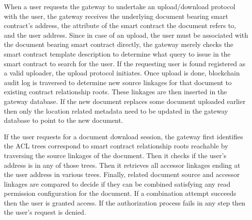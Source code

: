 When a user requests the gateway to undertake an upload/download protocol with the user, the gateway receives the underlying document bearing smart contract's address, the attribute of the smart contract the document refers to, and the user address. Since in case of an upload, the user must be associated with the document bearing smart contract directly, the gateway merely checks the smart contract template description to determine what query to issue in the smart contract to search for the user. If the requesting user is found registered as a valid uploader, the upload protocol initiates. Once upload is done, blockchain audit log is traversed to determine new source linkages for that document to existing contract relationship roots. These linkages are then inserted in the gateway database. If the new document replaces some document uploaded earlier then only the location related metadata need to be updated in the gateway database to point to the new document.       

If the user requests for a document download session, the gateway first identifies the ACL trees correspond to smart contract relationship roots reachable by traversing the source linkages of the document. Then it checks if the user's address is in any of those trees. Then it retrieves all accessor linkages ending at the user address in various trees. Finally, related document source and accessor linkages are compared to decide if they can be combined satisfying any read permission configuration for the document. If a combination attempt succeeds then the user is granted access. If the authorization process fails in any step then the user's request is denied.          
        